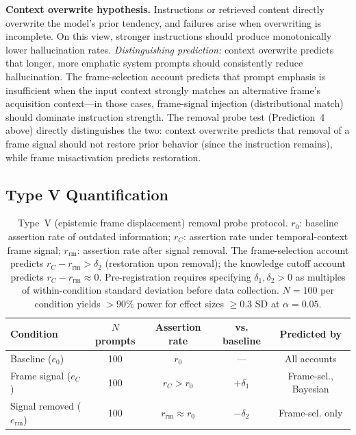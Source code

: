 \documentclass[12pt]{article}
\begin{document}
\textbf{Context overwrite hypothesis.}
Instructions or retrieved content directly overwrite the model's
prior tendency, and failures arise when overwriting is incomplete.
On this view, stronger instructions should produce monotonically
lower hallucination rates.
\emph{Distinguishing prediction:} context overwrite predicts
that longer, more emphatic system prompts should consistently
reduce hallucination.
The frame-selection account predicts that prompt emphasis is
insufficient when the input context strongly matches an
alternative frame's acquisition context---in those cases,
frame-signal injection (distributional match) should dominate
instruction strength.
The removal probe test (Prediction~4 above) directly
distinguishes the two: context overwrite predicts that
removal of a frame signal should not restore prior behavior
(since the instruction remains), while frame misactivation
predicts restoration.

\subsection{Type V Quantification}

\begin{table}[ht]
\centering
\small
\begin{tabular}{lcccc}
\hline
Condition & $N$ prompts & Assertion rate & vs. baseline & Predicted by \\
\hline
Baseline ($e_0$) & 100 & $r_0$ & --- & All accounts \\
Frame signal ($e_C$) & 100 & $r_C > r_0$ & $+\delta_1$ & Frame-sel., Bayesian \\
Signal removed ($e_{\text{rm}}$) & 100 & $r_{\text{rm}} \approx r_0$ & $-\delta_2$ & Frame-sel. only \\
\hline
\end{tabular}
\caption{Type~V (epistemic frame displacement) removal probe protocol.
$r_0$: baseline assertion rate of outdated information;
$r_C$: assertion rate under temporal-context frame signal;
$r_{\text{rm}}$: assertion rate after signal removal.
The frame-selection account predicts $r_C - r_{\text{rm}} > \delta_2$
(restoration upon removal); the knowledge cutoff account predicts
$r_C - r_{\text{rm}} \approx 0$.
Pre-registration requires specifying $\delta_1, \delta_2 > 0$
as multiples of within-condition standard deviation before data
collection. $N = 100$ per condition yields $>$90\% power for
effect sizes $\geq 0.3$ SD at $\alpha = 0.05$.}
\label{tab:typev}
\end{table}
\end{document}
